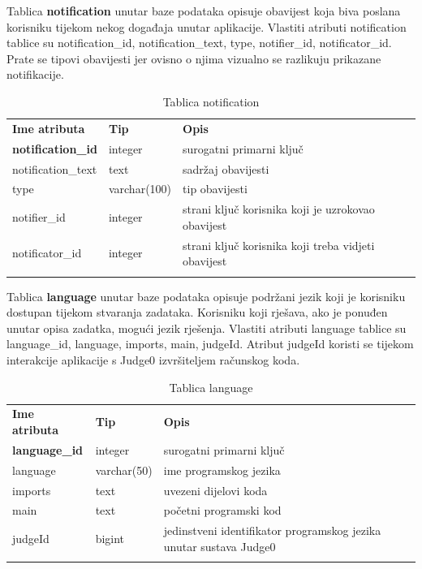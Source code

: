 \documentclass[times, utf8, zavrsni, numeric]{fer}
\begin{document}
		Tablica \textbf{notification} unutar baze podataka opisuje obavijest koja biva poslana korisniku tijekom nekog događaja unutar aplikacije. Vlastiti atributi notification tablice su notification\_id, notification\_text, type, notifier\_id, notificator\_id. Prate se tipovi obavijesti jer ovisno o njima vizualno se razlikuju prikazane notifikacije.
		\begin{table}[H]
			\caption{Tablica notification}
			\label{tbl:notification}
			\centering
			\begin{tabu} to \textwidth {XXX}
				\tabucline[1.75pt]{-}
				\textbf{Ime atributa} & \textbf{Tip} & \textbf{Opis}\\ 				
				\tabucline[1.75pt]{-}
				\textbf{notification\_id} & integer & surogatni primarni ključ\\ \hline
				notification\_text & text & sadržaj obavijesti\\ \hline
				type & varchar(100) & tip obavijesti\\ \hline
				notifier\_id & integer & strani ključ korisnika koji je uzrokovao obavijest\\ \hline
				notificator\_id & integer & strani ključ korisnika koji treba vidjeti obavijest\\ \hline
				\tabucline[1.75pt]{-}
			\end{tabu}
		\end{table}
	
		Tablica \textbf{language} unutar baze podataka opisuje podržani jezik koji je korisniku dostupan tijekom stvaranja zadataka. Korisniku koji rješava, ako je ponuđen unutar opisa zadatka, mogući jezik rješenja. Vlastiti atributi language tablice su language\_id, language, imports, main, judgeId. Atribut judgeId koristi se tijekom interakcije aplikacije s Judge0 izvršiteljem računskog koda. 
		\begin{table}[H]
			\caption{Tablica language}
			\label{tbl:language}
			\centering
			\begin{tabu} to \textwidth {XXX}
				\tabucline[1.75pt]{-}
				\textbf{Ime atributa} & \textbf{Tip} & \textbf{Opis}\\ 				
				\tabucline[1.75pt]{-}
				\textbf{language\_id} & integer & surogatni primarni ključ\\ \hline
				language & varchar(50) & ime programskog jezika\\ \hline
				imports & text & uvezeni dijelovi koda\\ \hline
				main & text & početni programski kod\\ \hline
				judgeId & bigint & jedinstveni identifikator programskog jezika unutar sustava Judge0\\ \hline
				\tabucline[1.75pt]{-}
			\end{tabu}
		\end{table}
	
\end{document}
